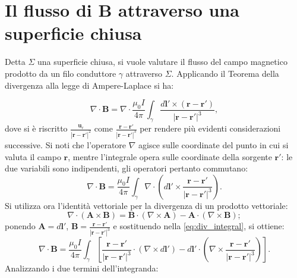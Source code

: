 \documentclass[a4paper,11pt]{report}
\begin{document}
\section{Il flusso di \texorpdfstring{$\bm{B}$}{campo magnetico} attraverso una superficie chiusa}
\label{sec:nablaB}
Detta $\Sigma$ una superficie chiusa, si vuole valutare il flusso del campo magnetico prodotto da un filo conduttore $\gamma$ attraverso $\Sigma$. Applicando il Teorema della divergenza alla legge di Ampere-Laplace si ha:

\begin{equation}
    \nabla \cdot \bm{B} = \nabla \cdot \frac{\mu_0 I}{4\pi} \int_\gamma \frac{d\bm{l}' \times (\bm{r}-\bm{r}')}{|\bm{r}-\bm{r}'|^3},
\end{equation}
dove si è riscritto $\frac{\bm{u}_r}{|\bm{r}-\bm{r}'|^2}$ come $\frac{\bm{r}-\bm{r}'}{|\bm{r}-\bm{r}'|^3}$ per rendere più evidenti considerazioni successive. Si noti che l'operatore $\nabla$ agisce sulle coordinate del punto in cui si valuta il campo $\bm{r}$, mentre l'integrale opera sulle coordinate della sorgente $\bm{r}'$: le due variabili sono indipendenti, gli operatori pertanto commutano:
\begin{equation}
    \nabla \cdot \bm{B} = \frac{\mu_0 I}{4\pi} \int_\gamma \nabla \cdot \left( d\bm{l}' \times \frac{\bm{r}-\bm{r}'}{|\bm{r}-\bm{r}'|^3} \right).
    \label{eq:div_integral}
\end{equation}
Si utilizza ora l'identità vettoriale per la divergenza di un prodotto vettoriale:
\begin{equation}
    \nabla \cdot(\bm{A} \times \bm{B}) = \bm{B}\cdot(\nabla\times\bm{A}) -\bm{A}\cdot(\nabla\times\bm{B});
\end{equation}
ponendo $\bm{A} = d\bm{l}'$, $\bm{B} = \frac{\bm{r}-\bm{r}'}{|\bm{r}-\bm{r}'|^3}$ e sostituendo nella \eqref{eq:div_integral}, si ottiene:
\begin{equation}
    \nabla \cdot \bm{B} = \frac{\mu_0 I}{4\pi} \int_\gamma \left[ \frac{\bm{r}-\bm{r}'}{|\bm{r}-\bm{r}'|^3} \cdot (\nabla \times d\bm{l}') - d\bm{l}' \cdot \left(\nabla \times \frac{\bm{r}-\bm{r}'}{|\bm{r}-\bm{r}'|^3} \right)\right].
\end{equation}
Analizzando i due termini dell'integranda:
\end{document}
